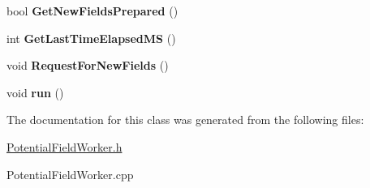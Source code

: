 \begin{DoxyCompactItemize}
\item 
\hypertarget{class_potential_field_worker_ac07ad556aee7ef58d9f00888bbe3613d}{bool {\bfseries Get\-New\-Fields\-Prepared} ()}\label{class_potential_field_worker_ac07ad556aee7ef58d9f00888bbe3613d}

\item 
\hypertarget{class_potential_field_worker_a1ede5ad12775a0f1a402d2cf75190747}{int {\bfseries Get\-Last\-Time\-Elapsed\-M\-S} ()}\label{class_potential_field_worker_a1ede5ad12775a0f1a402d2cf75190747}

\item 
\hypertarget{class_potential_field_worker_a57d837c08330c0745a45c7f5a36c3472}{void {\bfseries Request\-For\-New\-Fields} ()}\label{class_potential_field_worker_a57d837c08330c0745a45c7f5a36c3472}

\item 
\hypertarget{class_potential_field_worker_a9324b452759f542281ed659fadc97229}{void {\bfseries run} ()}\label{class_potential_field_worker_a9324b452759f542281ed659fadc97229}

\end{DoxyCompactItemize}


The documentation for this class was generated from the following files\-:\begin{DoxyCompactItemize}
\item 
\hyperlink{_potential_field_worker_8h}{Potential\-Field\-Worker.\-h}\item 
Potential\-Field\-Worker.\-cpp\end{DoxyCompactItemize}
